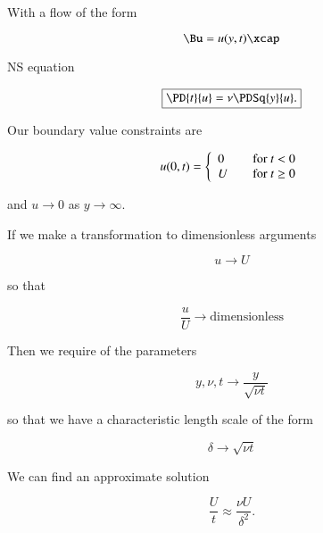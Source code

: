 With a flow of the form

\begin{equation}\label{eqn:continuumL16:230}
\Bu = u(y, t) \xcap
\end{equation}

NS equation

\begin{equation}\label{eqn:continuumL16:250}
\boxed{
\PD{t}{u} = \nu \PDSq{y}{u}.
}
\end{equation}

Our boundary value constraints are

\begin{equation}\label{eqn:continuumL16:270}
u(0, t) = 
\left\{
\begin{array}{l l}
0 & \quad \mbox{for $t < 0$} \\
U & \quad \mbox{for $t \ge 0$}
\end{array}
\right.
\end{equation}

and $u \rightarrow 0$ as $y \rightarrow \infty$.

If we make a transformation to dimensionless arguments

\begin{equation}\label{eqn:continuumL16:290}
u \rightarrow U
\end{equation}

so that

\begin{equation}\label{eqn:continuumL16:310}
\frac{u}{U} \rightarrow \text{dimensionless}
\end{equation}

Then we require of the parameters

\begin{equation}\label{eqn:continuumL16:330}
y, \nu, t \rightarrow \frac{y}{\sqrt{\nu t}}
\end{equation}

so that we have a characteristic length scale of the form

\begin{equation}\label{eqn:continuumL16:350}
\delta \rightarrow \sqrt{\nu t}
\end{equation}

We can find an approximate solution

\begin{equation}\label{eqn:continuumL16:370}
\frac{U}{t} \approx \frac{\nu U}{\delta^2}.
\end{equation}

